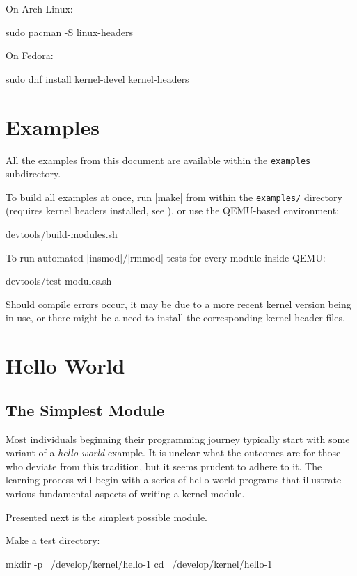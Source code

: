 \documentclass[10pt, oneside]{book}
\begin{document}
On Arch Linux:
\begin{codebash}
sudo pacman -S linux-headers
\end{codebash}

On Fedora:
\begin{codebash}
sudo dnf install kernel-devel kernel-headers
\end{codebash}

\section{Examples}
\label{sec:examples}
All the examples from this document are available within the \verb|examples| subdirectory.

To build all examples at once, run \sh|make| from within the \verb|examples/| directory
(requires kernel headers installed, see ), or use the QEMU-based
environment:
\begin{codebash}
devtools/build-modules.sh
\end{codebash}

To run automated \sh|insmod|/\sh|rmmod| tests for every module inside QEMU:
\begin{codebash}
devtools/test-modules.sh
\end{codebash}

Should compile errors occur, it may be due to a more recent kernel version being in use,
or there might be a need to install the corresponding kernel header files.

\section{Hello World}
\label{sec:helloworld}
\subsection{The Simplest Module}
\label{sec:org2d3e245}
Most individuals beginning their programming journey typically start with some variant of a \emph{hello world} example.
It is unclear what the outcomes are for those who deviate from this tradition, but it seems prudent to adhere to it.
The learning process will begin with a series of hello world programs that illustrate various fundamental aspects of writing a kernel module.

Presented next is the simplest possible module.

Make a test directory:
\begin{codebash}
mkdir -p ~/develop/kernel/hello-1
cd ~/develop/kernel/hello-1
\end{codebash}
\end{document}
